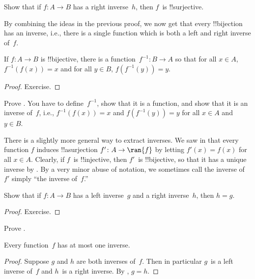 \documentclass[../../../include/open-logic-section]{subfiles}
\begin{document}
\begin{prob}
Show that if $f\colon A \to B$ has a right inverse~$h$, then $f$~is
!!{surjective}.
\end{prob}

\begin{explain}
  By combining the ideas in the previous proof, we now get that every
  !!{bijection} has an inverse, i.e., there is a single function
  which is both a left and right inverse of~$f$.
\end{explain}

\begin{prop}
If $f\colon A \to B$ is !!{bijective}, there is a
function~$f^{-1}\colon B \to A$ so that for all $x \in A$,
$f^{-1}(f(x)) = x$ and for all $y \in B$, $f(f^{-1}(y)) = y$.
\end{prop}

\begin{proof}
Exercise.
\end{proof}

\begin{prob}
Prove . You have to
define~$f^{-1}$, show that it is a function, and show that it is an
inverse of~$f$, i.e., $f^{-1}(f(x)) = x$ and $f(f^{-1}(y)) = y$ for
all $x \in A$ and $y \in B$.
\end{prob}

\begin{explain}
There is a slightly more general way to extract inverses. We saw in
 that every function $f$ induces !!a{surjection} $f'
\colon A \to \ran{f}$ by letting $f'(x) = f(x)$ for all $x \in A$.
Clearly, if $f$~is !!{injective}, then $f'$~is !!{bijective}, so that
it has a unique inverse by . By a very
minor abuse of notation, we sometimes call the inverse of $f'$ simply
``the inverse of~$f$.''
\end{explain}

\begin{prop}%
  Show that if $f\colon A \to B$ has a left inverse~$g$ and a right
  inverse~$h$, then $h = g$.
\end{prop}

\begin{proof}
  Exercise.
\end{proof}

\begin{prob}
  Prove .
\end{prob}

\begin{prop}
Every function~$f$ has at most one inverse.
\end{prop}

\begin{proof}
  Suppose $g$ and $h$ are both inverses of~$f$. Then in particular
  $g$~is a left inverse of~$f$ and $h$~is a right inverse. By
  , $g = h$.
\end{proof}
\end{document}

